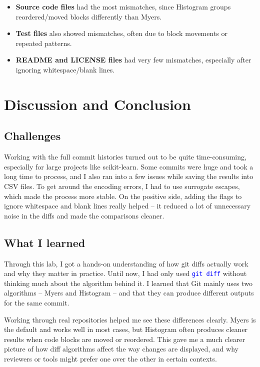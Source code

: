 \documentclass[10pt,a4paper]{report}
\newcommand{\command}[1]{\texttt{\textcolor{blue}{#1}}}
\begin{document}
\begin{itemize}[itemsep=0.2em, topsep=0pt]
    \item \textbf{Source code files} had the most mismatches, since Histogram groups reordered/moved blocks differently than Myers.
    \item \textbf{Test files} also showed mismatches, often due to block movements or repeated patterns.  
    \item \textbf{README and LICENSE files} had very few mismatches, especially after ignoring whitespace/blank lines.  
\end{itemize}

\section{Discussion and Conclusion}

\subsection{Challenges}
Working with the full commit histories turned out to be quite time-consuming, especially for large projects like scikit-learn. Some commits were huge and took a long time to process, and I also ran into a few issues while saving the results into CSV files. To get around the encoding errors, I had to use surrogate escapes, which made the process more stable. On the positive side, adding the flags to ignore whitespace and blank lines really helped -- it reduced a lot of unnecessary noise in the diffs and made the comparisons cleaner.

\subsection{What I learned}
Through this lab, I got a hands-on understanding of how git diffs actually work and why they matter in practice. Until now, I had only used \command{git diff} without thinking much about the algorithm behind it. I learned that Git mainly uses two algorithms -- Myers and Histogram -- and that they can produce different outputs for the same commit.

Working through real repositories helped me see these differences clearly. Myers is the default and works well in most cases, but Histogram often produces cleaner results when code blocks are moved or reordered. This gave me a much clearer picture of how diff algorithms affect the way changes are displayed, and why reviewers or tools might prefer one over the other in certain contexts.
\end{document}
